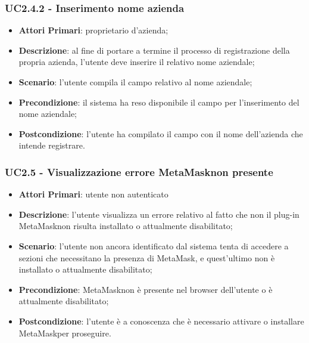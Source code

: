 \subsubsection{UC2.4.2 - Inserimento nome azienda}
\begin{itemize}
	\item \textbf{Attori Primari}: proprietario d'azienda;
	\item \textbf{Descrizione}: al fine di portare a termine il processo di registrazione della propria azienda, l'utente deve inserire il relativo nome aziendale;
	\item \textbf{Scenario}: l'utente compila il campo relativo al nome aziendale;
	\item \textbf{Precondizione}: il sistema ha reso disponibile il campo per l'inserimento del nome aziendale;
	\item \textbf{Postcondizione}: l'utente ha compilato il campo con il nome dell'azienda che intende registrare.
\end{itemize}



\subsubsection{UC2.5 - Visualizzazione errore MetaMask\glosp non presente}
\begin{itemize}
	\item \textbf{Attori Primari}: utente non autenticato
	\item \textbf{Descrizione}: l'utente visualizza un errore relativo al fatto che non il plug-in MetaMask\glosp non risulta installato o attualmente disabilitato;
	\item \textbf{Scenario}: l'utente non ancora identificato dal sistema tenta di accedere a sezioni che necessitano la presenza di MetaMask\glo, e quest'ultimo non è installato o attualmente disabilitato;
	\item \textbf{Precondizione}: MetaMask\glosp non è presente nel browser dell'utente o è attualmente disabilitato;
	\item \textbf{Postcondizione}: l'utente è a conoscenza che è necessario attivare o installare MetaMask\glosp per proseguire.

\end{itemize}

